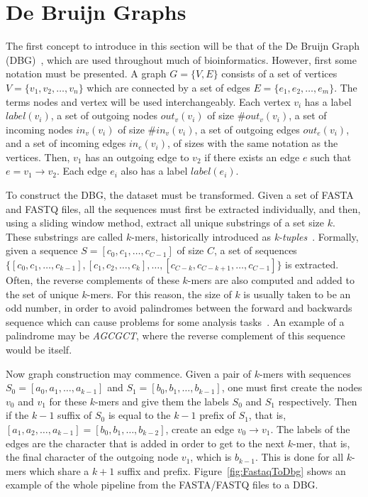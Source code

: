 \section{De Bruijn Graphs}\label{sec:DBG}

The first concept to introduce in this section will be that of the De Bruijn Graph (DBG)~\cite{DeBruijnGraph}, which are used throughout much of bioinformatics.
However, first some notation must be presented.
A graph $G=\{V,E\}$ consists of a set of vertices $V=\{v_1,v_2,\ldots,v_n\}$ which are connected by a set of edges $E=\{e_1, e_2, \ldots, e_m\}$.
The terms nodes and vertex will be used interchangeably.
Each vertex $v_i$ has a label $label(v_i)$, a set of outgoing nodes $out_v(v_i)$ of size $\#out_v(v_i)$, a set of incoming nodes $in_v(v_i)$ of size $\#in_v(v_i)$, a set of outgoing edges $out_e(v_i)$, and a set of incoming edges $in_e(v_i)$, of sizes with the same notation as the vertices.
Then, $v_1$ has an outgoing edge to $v_2$ if there exists an edge $e$ such that $e=v_1 \rightarrow v_2$.
Each edge $e_i$ also has a label $label(e_i)$.

To construct the DBG, the dataset must be transformed.
Given a set of FASTA and FASTQ files, all the sequences must first be extracted individually, and then, using a sliding window method, extract all unique substrings of a set size $k$.
These substrings are called $k$-mers, historically introduced as \textit{k-tuples}~\cite{DeBruijnGraph}.
Formally, given a sequence $S=[c_0, c_1, \ldots, c_{C-1}]$ of size $C$, a set of sequences $\{ [c_0,c_1,\ldots,c_{k - 1}], [c_1, c_2,\ldots,c_{k}], \ldots , [c_{C-k}, c_{C-k+1}, \ldots, c_{C - 1}]\}$ is extracted.
Often, the reverse complements of these $k$-mers are also computed and added to the set of unique $k$-mers.
For this reason, the size of $k$ is usually taken to be an odd number, in order to avoid palindromes between the forward and backwards sequence which can cause problems for some analysis tasks~\cite{Palindromes}.
An example of a palindrome may be \textit{AGCGCT}, where the reverse complement of this sequence would be itself.

Now graph construction may commence.
Given a pair of $k$-mers with sequences $S_0=[a_0, a_1, \ldots, a_{k - 1}]$ and $S_1=[b_0, b_1, \ldots, b_{k - 1}]$, one must first create the nodes $v_0$ and $v_1$ for these $k$-mers and give them the labels $S_0$ and $S_1$ respectively.
Then if the $k-1$ suffix of $S_0$ is equal to the $k-1$ prefix of $S_1$, that is, $[a_1, a_2, \ldots, a_{k - 1}] = [b_0, b_1, \ldots, b_{k-2}]$, create an edge $v_0 \rightarrow v_1$.
The labels of the edges are the character that is added in order to get to the next $k$-mer, that is, the final character of the outgoing node $v_1$, which is $b_{k - 1}$.
This is done for all $k$-mers which share a $k+1$ suffix and prefix.
Figure~\ref{fig:FastaqToDbg} shows an example of the whole pipeline from the FASTA/FASTQ files to a DBG.\@

